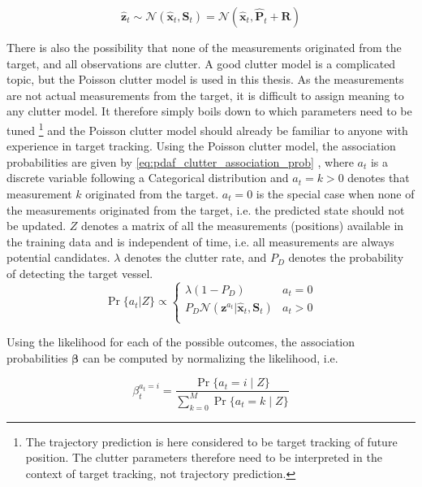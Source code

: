 \begin{equation} \label{eq:gp_ekf_pdaf_measurement}
    \hat{\boldsymbol{z}}_t \sim \mathcal{N}(\hat{\boldsymbol{x}}_t, \boldsymbol{S}_{t}) = \mathcal{N}(\hat{\boldsymbol{x}}_t, \hat{\boldsymbol{P}}_t + \boldsymbol{R})
\end{equation}

There is also the possibility that none of the measurements originated from the target, and all observations are clutter. A good clutter model is a complicated topic, but the Poisson clutter model is used in this thesis. As the measurements are not actual measurements from the target, it is difficult to assign meaning to any clutter model. It therefore simply boils down to which parameters need to be tuned \footnote{The trajectory prediction is here considered to be target tracking of future position. The clutter parameters therefore need to be interpreted in the context of target tracking, not trajectory prediction.} and the Poisson clutter model should already be familiar to anyone with experience in target tracking.
Using the Poisson clutter model, the association probabilities are given by \cref{eq:pdaf_clutter_association_prob} \cite{sensorfusjon}, where $a_t$ is a discrete variable following a Categorical distribution and $a_t=k > 0$ denotes that measurement $k$ originated from the target. $a_t = 0$ is the special case when none of the measurements originated from the target, i.e. the predicted state should not be updated. $Z$ denotes a matrix of all the measurements (positions) available in the training data and is independent of time, i.e. all measurements are always potential candidates. $\lambda$ denotes the clutter rate, and $P_D$ denotes the probability of detecting the target vessel.
\begin{equation}\label{eq:pdaf_clutter_association_prob}
    \Pr\{a_t | Z\} \propto \begin{cases}
        \lambda (1 - P_D)                                                                 & a_t = 0 \\
        P_D \mathcal{N} (\boldsymbol{z}^{a_t} | \hat{\boldsymbol{x}}_t, \boldsymbol{S}_t) & a_t > 0 \\
    \end{cases}
\end{equation}

Using the likelihood for each of the possible outcomes, the association probabilities $\boldsymbol{\beta}$ can be computed by normalizing the likelihood, i.e.

\begin{equation}
    \beta_t^{a_t=i} = \frac{\Pr\{a_t=i \; | \; Z\}}{\sum_{k=0}^M \Pr\{a_t=k \; | \; Z\}}
\end{equation}

